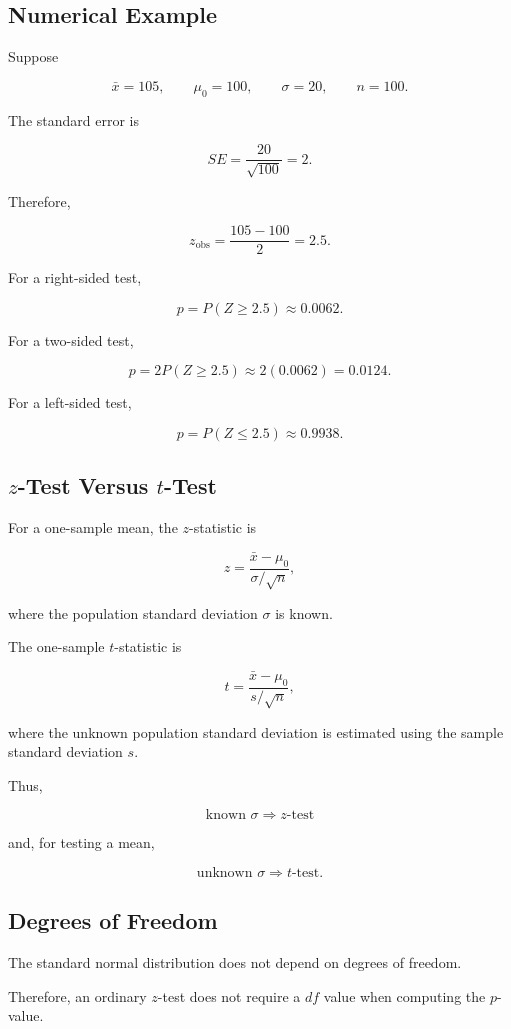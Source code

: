 \documentclass[11pt]{article}
\begin{document}
\subsection{Numerical Example}

Suppose

\[
\bar{x}=105,\qquad
\mu_0=100,\qquad
\sigma=20,\qquad
n=100.
\]

The standard error is

\[
SE=\frac{20}{\sqrt{100}}=2.
\]

Therefore,

\[
z_{\mathrm{obs}}
=
\frac{105-100}{2}
=
2.5.
\]

For a right-sided test,

\[
p=P(Z\geq2.5)\approx0.0062.
\]

For a two-sided test,

\[
p
=
2P(Z\geq2.5)
\approx
2(0.0062)
=
0.0124.
\]

For a left-sided test,

\[
p=P(Z\leq2.5)\approx0.9938.
\]

\subsection{\(z\)-Test Versus \(t\)-Test}

For a one-sample mean, the \(z\)-statistic is

\[
z
=
\frac{\bar{x}-\mu_0}{\sigma/\sqrt{n}},
\]

where the population standard deviation \(\sigma\) is known.

The one-sample \(t\)-statistic is

\[
t
=
\frac{\bar{x}-\mu_0}{s/\sqrt{n}},
\]

where the unknown population standard deviation is estimated using the
sample standard deviation \(s\).

Thus,

\[
\boxed{
\text{known }\sigma
\Rightarrow
z\text{-test}
}
\]

and, for testing a mean,

\[
\boxed{
\text{unknown }\sigma
\Rightarrow
t\text{-test}.
}
\]

\subsection{Degrees of Freedom}

The standard normal distribution does not depend on degrees of freedom.

Therefore, an ordinary \(z\)-test does not require a \(df\) value when
computing the \(p\)-value.
\end{document}
